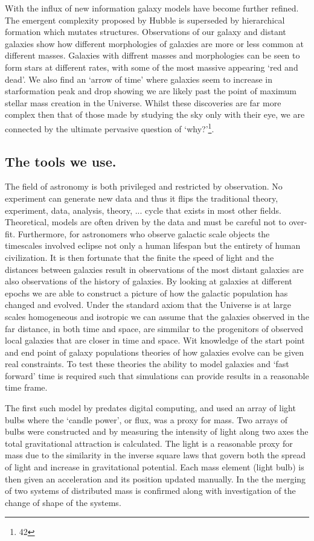 With the influx of new information galaxy models have become further refined. The emergent complexity proposed by Hubble is superseded by hierarchical formation which mutates structures. Observations of our galaxy and distant galaxies show how different morphologies of galaxies are more or less common at different masses. Galaxies with diffrent masses and morphologies can be seen to form stars at different rates, with some of the most massive appearing `red and dead'. We also find an `arrow of time' where galaxies seem to increase in starformation peak and drop showing we are likely past the point of maximum stellar mass creation in the Universe. Whilst these discoveries are far more complex then that of those made by studying the sky only with their eye, we are connected by the ultimate pervasive question of `why?'\footnote{42}.

\subsection{The tools we use.}
The field of astronomy is both privileged and restricted by observation. No experiment can generate new data and thus it flips the traditional theory, experiment, data, analysis, theory, ... cycle that exists in most other fields. Theoretical, models are often driven by the data and must be careful not to over-fit. Furthermore, for astronomers who observe galactic scale objects the timescales involved eclipse not only a human lifespan but the entirety of human civilization. It is then fortunate that the finite the speed of light and the distances between galaxies result in observations of the most distant galaxies are also observations of the history of galaxies. By looking at galaxies at different epochs we are able to construct a picture of how the galactic population has changed and evolved. Under the standard axiom that the Universe is at large scales homogeneous and isotropic we can assume that the galaxies observed in the far distance, in both time and space, are simmilar to the progenitors of observed local galaxies that are closer in time and space. Wit knowledge of the start point and end point of galaxy populations theories of how galaxies evolve can be given real constraints. To test these theories the ability to model galaxies and `fast forward' time is required such that simulations can provide results in a reasonable time frame.

The first such model by \citet{Holmberg1941OnProcedure.} predates digital computing, and used an array of light bulbs where the `candle power', or flux, was a proxy for mass. Two arrays of bulbs were constructed and by measuring the intensity of light along two axes the total gravitational attraction is calculated. The light is a reasonable proxy for mass due to the similarity in the inverse square laws that govern both the spread of light and increase in gravitational potential. Each mass element (light bulb) is then given an acceleration and its position updated manually. In the \citet{Holmberg1941OnProcedure.} the merging of two systems of distributed mass is confirmed along with investigation of the change of shape of the systems. 

